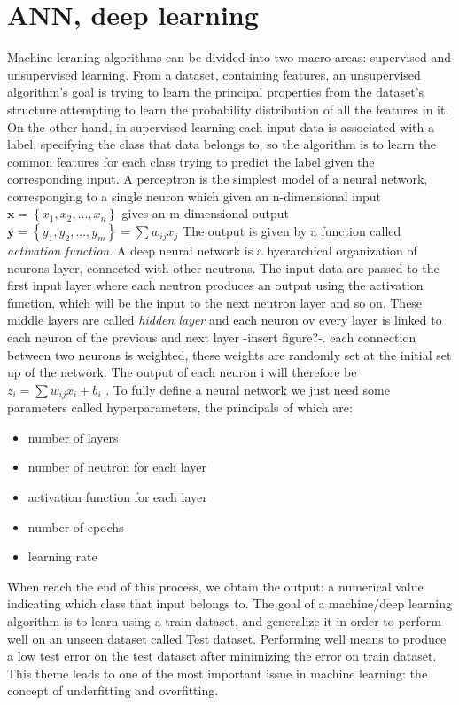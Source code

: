 \documentclass[a4paper,11pt]{article}
\begin{document}
\section{ANN, deep learning}
Machine leraning algorithms can be divided into two macro areas: supervised and unsupervised learning.
From a dataset, containing features, an unsupervised algorithm's goal is trying to learn the principal properties from the dataset's structure attempting to learn the probability distribution of all the features in it.
On the other hand, in supervised learning each input data is associated with a label, specifying the class that data belongs to, so the algorithm is to learn the common features for each class trying to predict the label given the corresponding input.
A perceptron is the simplest model of a neural network, corresponging to a single neuron which given an n-dimensional input $\textbf{x} = \left\{ x_1, x_2, ..., x_n\right\}$ gives an m-dimensional output $\textbf{y} = \left\{ y_1, y_2, ..., y_m\right\} = \sum w_{ij} x_j$
The output is given by a function called \emph{activation function}.
A deep neural network is a hyerarchical organization of neurons layer, connected with other neutrons.
The input data are passed to the first input layer where each neutron produces an output using the activation function, which will be the input to the next neutron layer and so on. These middle layers are called \emph{hidden layer} and each neuron ov every layer is linked to each neuron of the previous and next layer -insert figure?-.
each connection between two neurons is weighted, these weights are randomly set at the initial set up of the network.
The output of each neuron i will therefore be $z_i = \sum w_{ij}x_i + b_i$ .
To fully define a neural network we just need some parameters called hyperparameters, the principals of which are:
\begin{itemize}
\item number of layers
\item number of neutron for each layer
\item activation function for each layer
\item number of epochs
\item learning rate
\end{itemize}
When reach the end of this process, we obtain the output: a numerical value indicating which class that input belongs to.
The goal of a machine/deep learning algorithm is to learn using a train dataset, and generalize it in order to perform well on an unseen dataset called Test dataset. Performing well means to produce a low test error on the test dataset after minimizing the error on train dataset. This theme leads to one of the most important issue in machine learning: the concept of underfitting and overfitting.
\end{document}
